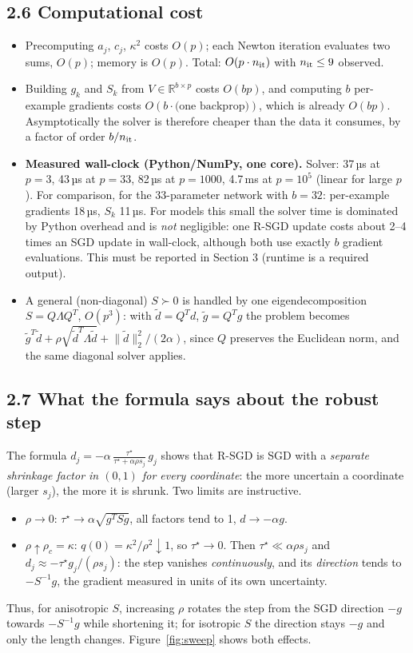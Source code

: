 \documentclass[11pt,a4paper]{article}
\newcommand{\norm}[1]{\lVert #1\rVert_2}
\begin{document}
\subsection*{2.6 Computational cost}

\begin{itemize}
\item Precomputing $a_j$, $c_j$, $\kappa^2$ costs $O(p)$; each Newton iteration
evaluates two sums, $O(p)$; memory is $O(p)$. Total: $O(p\cdot n_{\rm it})$ with
$n_{\rm it}\le9$ observed.
\item Building $g_k$ and $S_k$ from $V\in\mathbb R^{b\times p}$ costs $O(bp)$, and
computing $b$ per-example gradients costs $O(b\cdot\text{(one backprop)})$, which is
already $O(bp)$. Asymptotically the solver is therefore cheaper than the data it
consumes, by a factor of order $b/n_{\rm it}$.
\item \textbf{Measured wall-clock (Python/NumPy, one core).} Solver: 37\,µs at
$p=3$, 43\,µs at $p=33$, 82\,µs at $p=1000$, 4.7\,ms at $p=10^5$ (linear for large
$p$). For comparison, for the 33-parameter network with $b=32$: per-example gradients
18\,µs, $S_k$ 11\,µs. For models this small the solver time is dominated by Python
overhead and is \emph{not} negligible: one R-SGD update costs about 2--4 times an SGD
update in wall-clock, although both use exactly $b$ gradient evaluations. This must be
reported in Section 3 (runtime is a required output).
\item A general (non-diagonal) $S\succ0$ is handled by one eigendecomposition
$S=Q\Lambda Q^T$, $O(p^3)$: with $\tilde d=Q^Td$, $\tilde g=Q^Tg$ the problem becomes
$\tilde g^T\tilde d+\rho\sqrt{\tilde d^T\Lambda\tilde d}+\norm{\tilde d}^2/(2\alpha)$,
since $Q$ preserves the Euclidean norm, and the same diagonal solver applies.
\end{itemize}

\subsection*{2.7 What the formula says about the robust step}

The formula $d_j=-\alpha\,\frac{\tau^\star}{\tau^\star+\alpha\rho s_j}\,g_j$ shows
that R-SGD is SGD with a \emph{separate shrinkage factor in $(0,1)$ for every
coordinate}: the more uncertain a coordinate (larger $s_j$), the more it is shrunk.
Two limits are instructive.
\begin{itemize}
\item $\rho\to0$: $\tau^\star\to\alpha\sqrt{g^TSg}$, all factors tend to 1, $d\to-\alpha g$.
\item $\rho\uparrow\rho_c=\kappa$: $q(0)=\kappa^2/\rho^2\downarrow1$, so $\tau^\star\to0$.
Then $\tau^\star\ll\alpha\rho s_j$ and
$d_j\approx-\tau^\star g_j/(\rho s_j)$: the step vanishes \emph{continuously}, and its
\emph{direction} tends to $-S^{-1}g$, the gradient measured in units of its own
uncertainty.
\end{itemize}
Thus, for anisotropic $S$, increasing $\rho$ rotates the step from the SGD direction
$-g$ towards $-S^{-1}g$ while shortening it; for isotropic $S$ the direction stays
$-g$ and only the length changes. Figure~\ref{fig:sweep} shows both effects.
\end{document}
